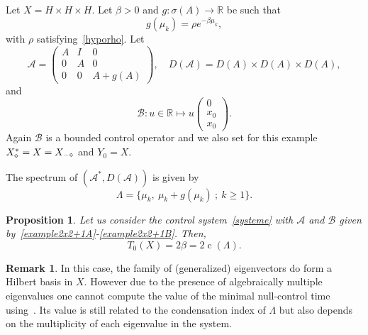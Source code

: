 \documentclass[11pt]{article}
\newtheorem{prop}[theo]{Proposition}
\theoremstyle{definition}
\newtheorem{rema}[theo]{Remark}
\numberwithin{equation}{section}
\numberwithin{figure}{section}
\numberwithin{table}{section}
\newcommand\A{\mathcal{A}}
\newcommand\As{\mathcal{A}^*}
\newcommand\B{\mathcal{B}}
\newcommand{\DA}{D(\A)}
\newcommand{\Xalphas}{X_\diamond^*}
\newcommand{\Xmalpha}{X_{-\diamond}}
\newcommand{\Fzp}{Y_0}
\newcommand{\R}{\mathbb{R}}
\DeclareMathOperator{\cond}{c}
\begin{document}
Let $X=H\times H\times H$. Let $\beta>0$ and $g : \sigma(A) \to \R$ be such that
\begin{equation}\label{Def_g_1}
g(\mu_k) = \rho e^{-\beta \mu_k},
\end{equation}
with $\rho$ satisfying~\eqref{hyporho}. Let
\begin{equation}\label{example2x2+1A}
\A=
\begin{pmatrix} A & I & 0 \\ 0 & A & 0 \\ 0 & 0 &A+g(A)
\end{pmatrix},
\quad
\DA=D(A)\times D(A)\times D(A),
\end{equation}
and
\begin{equation}\label{example2x2+1B}
\B : u \in \R \mapsto u
\begin{pmatrix} 0 \\ x_0 \\ x_0
\end{pmatrix}.
\end{equation}
Again $\B$ is a bounded control operator and we also set for this example $\Xalphas = X\linebreak= \Xmalpha$ and $\Fzp=X$.

The spectrum of $(\As, \DA)$ is given by
\[
\Lambda = \{ \mu_k, \: \mu_k+g(\mu_k) \: ; \: k \geq 1\}.
\]

\begin{prop}\label{Prop:Academique2}
Let us consider the control system~\eqref{systeme} with $\A$ and $\B$ given by~\eqref{example2x2+1A}-\eqref{example2x2+1B}. Then,
\begin{equation}\label{T0_Academique2}
T_0(X) = 2\beta = 2 \cond(\Lambda).
\end{equation}
\end{prop}

\begin{rema}
In this case, the family of (generalized) eigenvectors do form a Hilbert basis in $X$. However due to the presence of algebraically multiple eigenvalues one cannot compute the value of the minimal null-control time using~\cite{AmmarKhodjaBenabdallahGonzalez-BurgosdeTeresa:2014}. Its value is still related to the condensation index of $\Lambda$ but also depends on the multiplicity of each eigenvalue in the system.
\end{rema}
\end{document}
